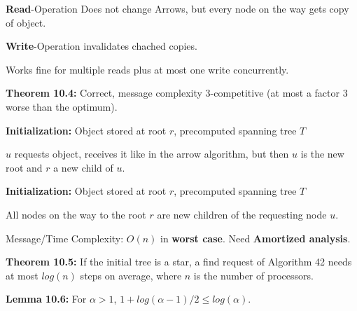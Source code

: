 {
	\begin{items}
		\item {\bf Read}-Operation Does not change Arrows, but every node on the way gets copy of object.
		\item {\bf Write}-Operation invalidates chached copies.
		\item Works fine for multiple reads plus at most one write concurrently.
		\item {\bf Theorem 10.4:} Correct, message complexity $3$-competitive (at most a factor $3$ worse than the optimum).
	\end{items}
}

{
	\begin{items}
		\item {\bf Initialization:} Object stored at root $r$, precomputed spanning tree $T$
		\item $u$ requests object, receives it like in the arrow algorithm, but then $u$ is the new root and $r$ a new child of $u$.
	\end{items}
}

{
	\begin{items}
		\item {\bf Initialization:} Object stored at root $r$, precomputed spanning tree $T$
		\item All nodes on the way to the root $r$ are new children of the requesting node $u$.
		\item Message/Time Complexity: $O(n)$ in {\bf worst case}. Need {\bf Amortized analysis}.
		\item {\bf Theorem 10.5:} If the initial tree is a star, a find request of Algorithm 42 needs 
			at most $log(n)$ steps on average, where $n$ is the number of processors.
		\item {\bf Lemma 10.6:} For $\alpha>1$, $1+log(\alpha-1)/2\le log(\alpha)$.
	\end{items}
}












